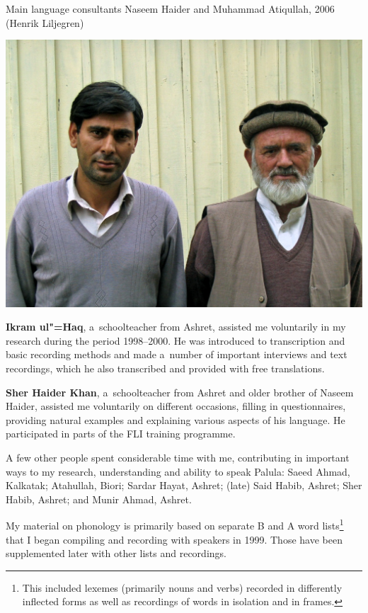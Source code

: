 \begin{photofigure}[t]
\caption{Main language consultants Naseem Haider and Muhammad Atiqullah, 2006 (Henrik Liljegren)}
\includegraphics[width=\textwidth]{figures/ch1photo1.jpg}
\end{photofigure}

\textbf{Ikram ul"=Haq}, a~schoolteacher from Ashret, assisted me voluntarily in my research during
the period 1998--2000. He was introduced to transcription and basic recording methods and made
a~number of important interviews and text recordings, which he also transcribed and provided with
free translations.


\textbf{Sher Haider Khan}, a~schoolteacher from Ashret and older brother of Naseem Haider, assisted me
voluntarily on different occasions, filling in questionnaires, providing natural examples and
explaining various aspects of his language. He participated in parts of the FLI training programme.


A few other people spent considerable time with me, contributing in important ways to my research,
understanding and ability to speak Palula: Saeed Ahmad, Kalkatak; Atahullah, Biori; Sardar
Hayat, Ashret; (late) Said Habib, Ashret; Sher Habib, Ashret; and Munir Ahmad, Ashret.


My material on phonology is primarily based on separate B and A word lists\footnote{This included
  lexemes (primarily nouns and verbs) recorded in differently inflected forms as well as recordings
  of words in isolation and in frames.} that I began compiling and recording with speakers in
1999. Those have been supplemented later with other lists and recordings.

